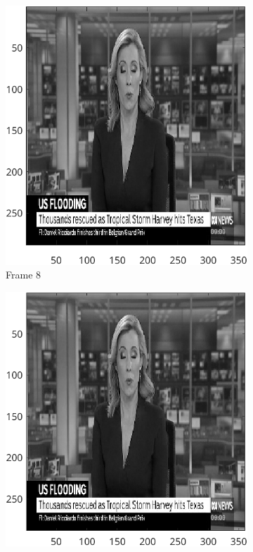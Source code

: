 \documentclass{article}
\begin{document}
		\begin{figure}[ht]
		\centering

		\begin{subfigure}[t]{0.45\textwidth}
			\centering

			\includegraphics[width=\textwidth]{2B_Input4Orig2}

			\caption{Frame 8}
			\label{fig:2B_Input4Orig2}

		\end{subfigure}
		\hspace{1cm}
		\begin{subfigure}[t]{0.45\textwidth}
			\centering

			\includegraphics[width=\textwidth]{2B_Input4Ref2}


\end{subfigure}
\end{figure}
\end{document}
